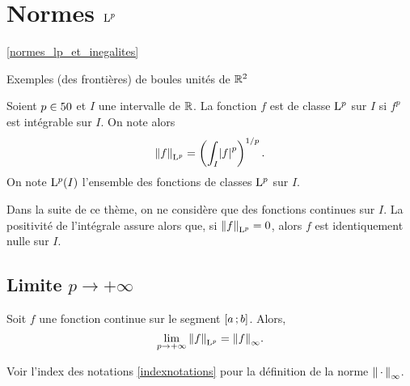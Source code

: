 \section{Normes $\mathrm{L}^p$}
\ref{normes_lp_et_inegalites}

\begin{marginfigure}
    \centering
    
    \caption{Exemples (des frontières) de boules unités de $\mathbb{R}^2$}
\end{marginfigure}
\begin{defi}
Soient $p \in 50$ et $I$ une intervalle de $\mathbb{R}$. La fonction $f$ est de classe $\mathrm{L}^p$ sur $I$ si $f^p$ est intégrable sur $I$. On note alors
\[
\norm{f}_{\mathrm{L}^p} = \left(\int_I \mathopen{}\left| f \right|^p\right)^{1/p}.
\]
On note $\mathrm{L}^p(I)$ l'ensemble des fonctions de classes $\mathrm{L}^p$ sur $I$.
\end{defi}

\begin{remarque}
Dans la suite de ce thème, on ne considère que des fonctions continues sur $I$. La positivité de l'intégrale assure alors que, si $\norm{f}_{\mathrm{L}^p} = 0$, alors $f$ est identiquement nulle sur $I$.
\end{remarque}

\subsection{Limite $p \to +\infty$}

\begin{theo}
Soit $f$ une fonction continue sur le segment $\left[a\,;b\right]$. Alors,
\[
\lim_{p\to+\infty} \norm{f}_{\mathrm{L}^p} = \norm{f}_\infty.
\]
\end{theo}
Voir l'index des notations \ref{indexnotations} pour la définition de la norme $\norm{\,\cdot\,}_\infty$.



